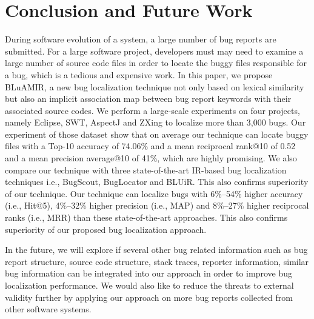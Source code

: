 \documentclass[conference]{IEEEtran}
\begin{document}
\section{Conclusion and Future Work} \label{sec:conclusionANDfuture}
During software evolution of a system, a large number of bug reports are submitted. For a large software project, developers must may need to examine a large number of source code files in order to locate the buggy files responsible for a bug, which is a tedious and expensive work. In this paper, we propose BLuAMIR, a new bug localization technique not only based on lexical similarity but also an implicit association map between bug report keywords with their associated source codes. We perform a large-scale experiments on four projects, namely Eclipse, SWT, AspectJ and ZXing to localize more than 3,000 bugs. Our experiment of those dataset show that on average our technique can locate buggy files with a Top-10 accuracy of 74.06\% and a mean reciprocal rank@10 of 0.52 and a mean precision average@10 of 41\%, which are highly promising. We also compare our technique with three state-of-the-art IR-based bug localization techniques i.e., BugScout\cite{Nguyen}, BugLocator\cite{Jian} and BLUiR\cite{Saha}.  This also confirms superiority of our technique. Our technique can localize bugs with 6\%--54\% higher accuracy (i.e., Hit@5), 4\%--32\% higher precision (i.e., MAP) and 8\%--27\% higher reciprocal ranks (i.e., MRR) than these state-of-the-art approaches. This also confirms superiority of our proposed bug localization approach. 

In the future, we will explore if several other bug related information such as bug report structure, source code structure, stack traces, reporter information, similar bug information can be integrated into our approach in order to improve bug localization performance. We would also like to reduce the threats to external validity further by applying our approach on more bug reports collected from other software systems.

\balance
\end{document}
